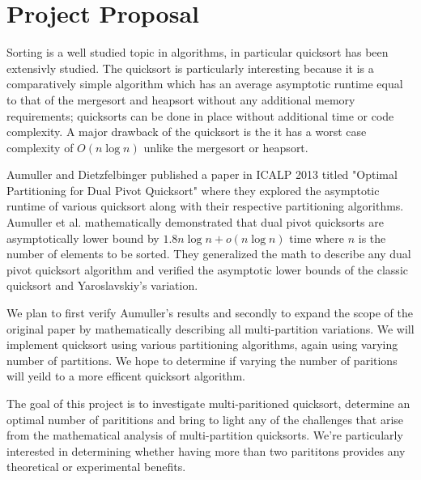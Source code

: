 \documentclass[12pt]{report}
\begin{document}
	\section{Project Proposal}
	
	Sorting is a well studied topic in algorithms, in particular quicksort has been extensivly studied. 
	The quicksort is particularly interesting because it is a comparatively simple algorithm which has an average asymptotic runtime equal to that of the mergesort and heapsort without any additional memory requirements; quicksorts can be done in place without additional time or code complexity. 
	A major drawback of the quicksort is the it has a worst case complexity of $O(n\log n)$ unlike the mergesort or heapsort\cite{sedgewick1977analysis}.

	Aumuller and Dietzfelbinger published a paper in ICALP 2013 titled "Optimal Partitioning for Dual Pivot Quicksort" where they explored the asymptotic runtime of various quicksort along with their respective partitioning algorithms\cite{Aumuller:2013:OPD:2525857.2525862}. 
	Aumuller et al. mathematically demonstrated that dual pivot quicksorts are asymptotically lower bound by $1.8n\log n + o(n\log n)$ time where $n$ is the number of elements to be sorted. They generalized the math to describe any dual pivot quicksort algorithm and verified the asymptotic lower bounds of the classic quicksort and Yaroslavskiy's variation\cite{Wild:2012:ACA:2404160.2404231}. 

	We plan to first verify Aumuller's results and secondly to expand the scope of the original paper by mathematically describing all multi-partition variations. We will implement quicksort using various partitioning algorithms, again using varying number of partitions. We hope to determine if varying the number of paritions will yeild to a more efficent quicksort algorithm.

	The goal of this project is to investigate multi-paritioned quicksort, determine an optimal number of parititions and bring to light any of the challenges that arise from the mathematical analysis of multi-partition quicksorts. We're particularly interested in determining whether having more than two parititons provides any theoretical or experimental benefits.
\end{document}
